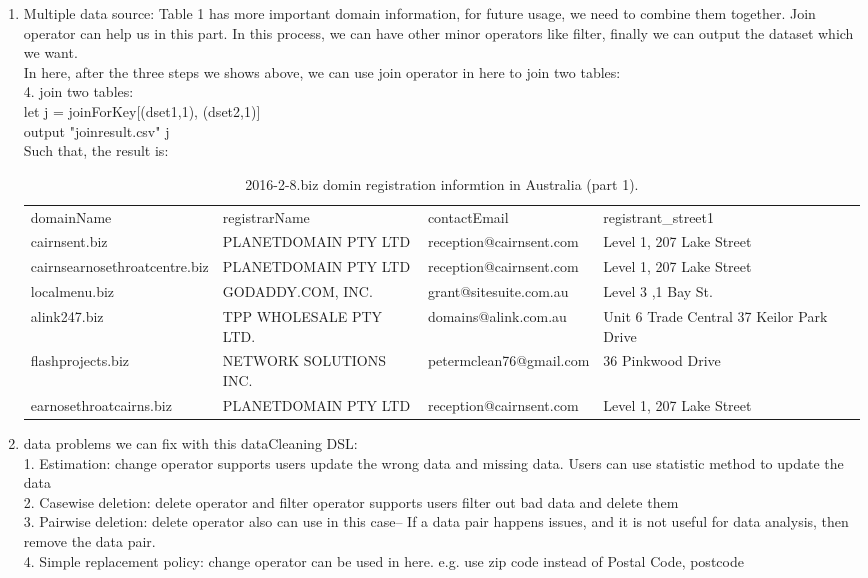 \documentclass[11pt]{article}
\begin{document}
\begin{enumerate}[(1)]
 \item  Multiple data source:
Table 1 has more important domain information, for future usage, we need to combine them together. Join operator can help us in this part. In this process, we can have other minor operators like filter, finally we can output the dataset which we want.\\
In here, after the three steps we shows above, we can use join operator in here to join two tables:\\
4. join two tables:\\
let j = joinForKey[(dset1,1), (dset2,1)]\\
output "joinresult.csv" j\\
Such that, the result is:\\
\begin{table}[h!]
  \centering
  \caption{2016-2-8.biz domin registration informtion in Australia (part 1).}
  \label{tab:table1}
       \begin{tabular}{llll}
domainName                    & registrarName          & contactEmail   &    registrant\_street1  \\
cairnsent.biz                 & PLANETDOMAIN PTY LTD   & reception@cairnsent.com  &Level 1, 207 Lake Street   \\
cairnsearnosethroatcentre.biz & PLANETDOMAIN PTY LTD   & reception@cairnsent.com & Level 1, 207 Lake Street  \\
localmenu.biz                 & GODADDY.COM, INC.      & grant@sitesuite.com.au &Level 3 ,1 Bay St.  \\
alink247.biz                  & TPP WHOLESALE PTY LTD. & domains@alink.com.au     & Unit 6 Trade Central 37 Keilor Park Drive  \\
flashprojects.biz             & NETWORK SOLUTIONS INC. & petermclean76@gmail.com   & 36 Pinkwood Drive    \\
earnosethroatcairns.biz       & PLANETDOMAIN PTY LTD   & reception@cairnsent.com     & Level 1, 207 Lake Street   


  \end{tabular}
\end{table}

\item data problems we can fix with this dataCleaning DSL:\\
 1. Estimation: change operator supports users update the wrong data and missing data. Users can use statistic method to update the data\\
2. Casewise deletion: delete operator and filter operator supports users filter out bad data and delete them \\
3. Pairwise deletion: delete operator also can use in this case-- If a data pair happens issues, and it is not useful for data analysis, then remove the data pair.\\
4. Simple replacement policy: change operator can be used in here.  e.g. use zip code instead of Postal Code, postcode\\

\end{enumerate}
\end{document}

